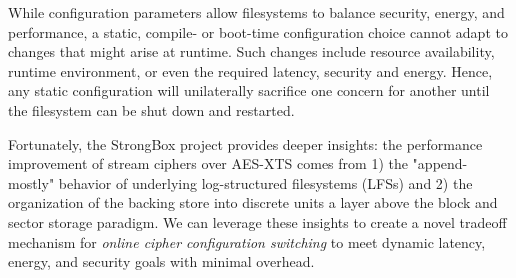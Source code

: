 While configuration parameters allow filesystems to balance security,
energy, and performance, a static,  compile- or boot-time configuration choice cannot adapt
to changes that might arise at runtime.  Such changes include resource availability, runtime environment, or even the required latency, security and energy. Hence, any static
configuration will unilaterally sacrifice one concern for another until the filesystem can be shut down and restarted.

Fortunately, the StrongBox project provides deeper insights: the performance improvement of stream ciphers over
AES-XTS comes from 1) the "append-mostly" behavior of underlying log-structured filesystems (LFSs) and
2) the organization of the backing store into discrete units a layer above the
block and sector storage paradigm. We can leverage these insights to create a
novel tradeoff mechanism for \emph{online cipher configuration switching} to meet
dynamic latency, energy, and security goals with minimal overhead.

 


